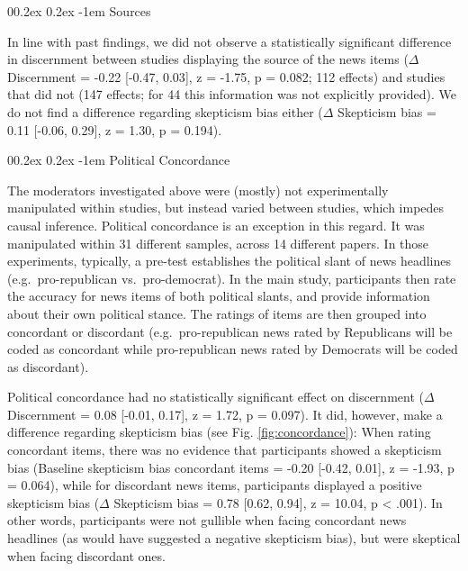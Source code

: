 \documentclass[
  man]{apa6}
\makeatletter
\let\oldparagraph\paragraph
\renewcommand{\paragraph}{
    \@ifstar
      \xxxParagraphStar
      \xxxParagraphNoStar
  }
\newcommand{\xxxParagraphStar}[1]{\oldparagraph*{#1}\mbox{}}
\newcommand{\xxxParagraphNoStar}[1]{\oldparagraph{#1}\mbox{}}
\renewcommand{\paragraph}{\@startsection{paragraph}{4}{\parindent}%
  {0\baselineskip \@plus 0.2ex \@minus 0.2ex}%
  {-1em}%
  {\normalfont\normalsize\bfseries\itshape\typesectitle}}
\makeatother
\begin{document}
\paragraph{Sources}\label{sources}

In line with past findings, we did not observe a statistically significant difference in discernment between studies displaying the source of the news items (\(\Delta\) Discernment = -0.22 {[}-0.47, 0.03{]}, z = -1.75, p = 0.082; 112 effects) and studies that did not (147 effects; for 44 this information was not explicitly provided). We do not find a difference regarding skepticism bias either (\(\Delta\) Skepticism bias = 0.11 {[}-0.06, 0.29{]}, z = 1.30, p = 0.194).

\paragraph{Political Concordance}\label{political-concordance}

The moderators investigated above were (mostly) not experimentally manipulated within studies, but instead varied between studies, which impedes causal inference. Political concordance is an exception in this regard. It was manipulated within 31 different samples, across 14 different papers. In those experiments, typically, a pre-test establishes the political slant of news headlines (e.g.~pro-republican vs.~pro-democrat). In the main study, participants then rate the accuracy for news items of both political slants, and provide information about their own political stance. The ratings of items are then grouped into concordant or discordant (e.g.~pro-republican news rated by Republicans will be coded as concordant while pro-republican news rated by Democrats will be coded as discordant).

Political concordance had no statistically significant effect on discernment (\(\Delta\) Discernment = 0.08 {[}-0.01, 0.17{]}, z = 1.72, p = 0.097). It did, however, make a difference regarding skepticism bias (see Fig. \ref{fig:concordance}): When rating concordant items, there was no evidence that participants showed a skepticism bias (Baseline skepticism bias concordant items = -0.20 {[}-0.42, 0.01{]}, z = -1.93, p = 0.064), while for discordant news items, participants displayed a positive skepticism bias (\(\Delta\) Skepticism bias = 0.78 {[}0.62, 0.94{]}, z = 10.04, p \textless{} .001). In other words, participants were not gullible when facing concordant news headlines (as would have suggested a negative skepticism bias), but were skeptical when facing discordant ones.
\end{document}

